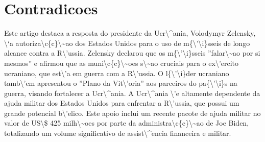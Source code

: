 \documentclass{article}%
\begin{document}
\section{Contradicoes}%
\label{sec:Contradicoes}%
Este artigo destaca a resposta do presidente da Ucr\textbackslash{}\^{}ania, Volodymyr Zelensky, \textbackslash{}`a autoriza\textbackslash{}c\{c\}\textbackslash{}\textasciitilde{}ao dos Estados Unidos para o uso de m\{\textbackslash{}'\textbackslash{}i\}sseis de longo alcance contra a R\textbackslash{}'ussia. Zelensky declarou que os m\{\textbackslash{}'\textbackslash{}i\}sseis ''falar\textbackslash{}\textasciitilde{}ao por si mesmos'' e afirmou que as muni\textbackslash{}c\{c\}\textbackslash{}\textasciitilde{}oes s\textbackslash{}\textasciitilde{}ao cruciais para o ex\textbackslash{}'ercito ucraniano, que est\textbackslash{}'a em guerra com a R\textbackslash{}'ussia. O l\{\textbackslash{}'\textbackslash{}i\}der ucraniano tamb\textbackslash{}'em apresentou o ''Plano da Vit\textbackslash{}'oria'' aos parceiros do pa\{\textbackslash{}'\textbackslash{}i\}s na guerra, visando fortalecer a Ucr\textbackslash{}\^{}ania. A Ucr\textbackslash{}\^{}ania \textbackslash{}'e altamente dependente da ajuda militar dos Estados Unidos para enfrentar a R\textbackslash{}'ussia, que possui um grande potencial b\textbackslash{}'elico. Este apoio inclui um recente pacote de ajuda militar no valor de US\textbackslash{}\$ 425 milh\textbackslash{}\textasciitilde{}oes por parte da administra\textbackslash{}c\{c\}\textbackslash{}\textasciitilde{}ao de Joe Biden, totalizando um volume significativo de assist\textbackslash{}\^{}encia financeira e militar.

%
\end{document}
